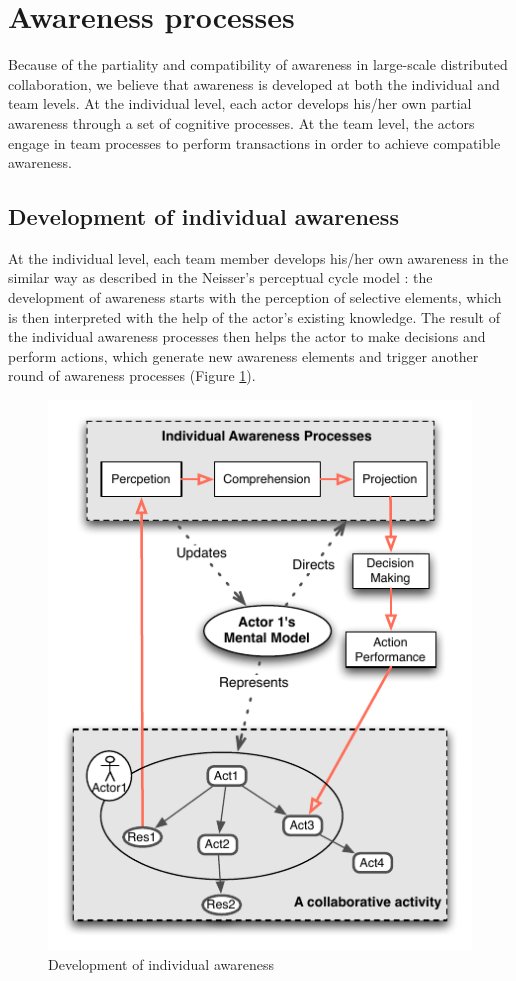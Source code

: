 \section{Awareness processes} %
\label{sec:awareness_processes}
Because of the partiality and compatibility of awareness in large-scale distributed collaboration, we believe that awareness is developed at both the individual and team levels. At the individual level, each actor develops his/her own partial awareness through a set of cognitive processes. At the team level, the actors engage in team processes to perform transactions in order to achieve compatible awareness. 

\subsection{Development of individual awareness} %
\label{sub:development_of_individual_awareness}
At the individual level, each team member develops his/her own awareness in the similar way as described in the Neisser's perceptual cycle model \cite{neisser1976cognition}: the development of awareness starts with the perception of selective elements, which is then interpreted with the help of the actor's existing knowledge. The result of the individual awareness processes then helps the actor to make decisions and perform actions, which generate new awareness elements and trigger another round of awareness processes (Figure \ref{fig:individual_processes}). 

\begin{figure}[htbp] %
   \centering
   \includegraphics{individual_processes.pdf} 
   \caption{Development of individual awareness}
   \label{fig:individual_processes}
\end{figure}

